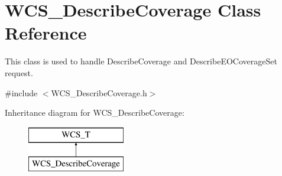 \hypertarget{classWCS__DescribeCoverage}{
\section{WCS\_\-DescribeCoverage Class Reference}
\label{classWCS__DescribeCoverage}
}


This class is used to handle DescribeCoverage and DescribeEOCoverageSet request.  




{\ttfamily \#include $<$WCS\_\-DescribeCoverage.h$>$}

Inheritance diagram for WCS\_\-DescribeCoverage:\begin{figure}[H]
\begin{center}
\leavevmode
\includegraphics[height=2.000000cm]{classWCS__DescribeCoverage}
\end{center}
\end{figure}
